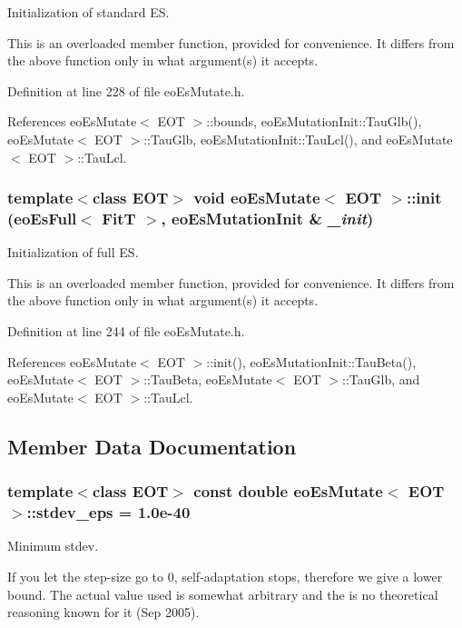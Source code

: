 Initialization of standard ES. 

This is an overloaded member function, provided for convenience. It differs from the above function only in what argument(s) it accepts. 

Definition at line 228 of file eo\-Es\-Mutate.h.

References eo\-Es\-Mutate$<$ EOT $>$::bounds, eo\-Es\-Mutation\-Init::Tau\-Glb(), eo\-Es\-Mutate$<$ EOT $>$::Tau\-Glb, eo\-Es\-Mutation\-Init::Tau\-Lcl(), and eo\-Es\-Mutate$<$ EOT $>$::Tau\-Lcl.
\subsubsection{\setlength{\rightskip}{0pt plus 5cm}template$<$class EOT$>$ void {\bf eo\-Es\-Mutate}$<$ {\bf EOT} $>$::init ({\bf eo\-Es\-Full}$<$ {\bf Fit\-T} $>$, {\bf eo\-Es\-Mutation\-Init} \& {\em \_\-init})\hspace{0.3cm}{\tt  [inline, private]}}\label{classeo_es_mutate_d2}


Initialization of full ES. 

This is an overloaded member function, provided for convenience. It differs from the above function only in what argument(s) it accepts. 

Definition at line 244 of file eo\-Es\-Mutate.h.

References eo\-Es\-Mutate$<$ EOT $>$::init(), eo\-Es\-Mutation\-Init::Tau\-Beta(), eo\-Es\-Mutate$<$ EOT $>$::Tau\-Beta, eo\-Es\-Mutate$<$ EOT $>$::Tau\-Glb, and eo\-Es\-Mutate$<$ EOT $>$::Tau\-Lcl.

\subsection{Member Data Documentation}
\subsubsection{\setlength{\rightskip}{0pt plus 5cm}template$<$class EOT$>$ const double {\bf eo\-Es\-Mutate}$<$ {\bf EOT} $>$::{\bf stdev\_\-eps} = 1.0e-40\hspace{0.3cm}{\tt  [static, private]}}\label{classeo_es_mutate_v0}


Minimum stdev. 

If you let the step-size go to 0, self-adaptation stops, therefore we give a lower bound. The actual value used is somewhat arbitrary and the is no theoretical reasoning known for it (Sep 2005).

